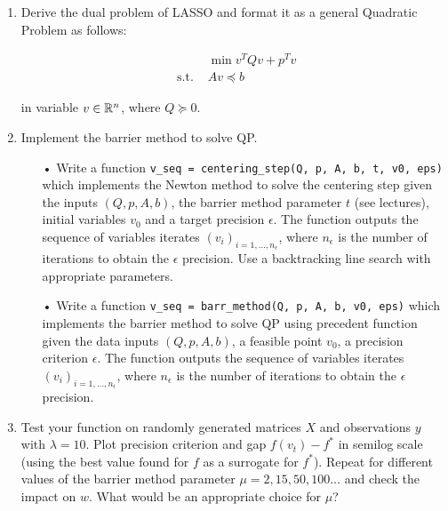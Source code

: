 \documentclass[a4paper, 11pt]{report}
\begin{document}
\begin{enumerate}
	\item Derive the dual problem of LASSO and format it as a general Quadratic Problem as follows:
	
	\begin{equation*}
		\begin{aligned}
		& \min v^{T}Qv + p^{T}v \\
		\text{ s.t. } & Av \preceq b 
		\end{aligned}
	\end{equation*}
	
	in variable $v \in \mathbb{R}^{n}$, where $Q \succeq 0$.
	
	\item Implement the barrier method to solve QP.
	
	\begin{itemize}
		\item[•] Write a function \texttt{v\_seq = centering\_step(Q, p, A, b, t, v0, eps)} which implements the Newton method to solve the centering step given the inputs $(Q, p, A, b)$, the barrier method parameter $t$ (see lectures), initial variables $v_0$ and a target precision $\epsilon$. The function outputs the sequence of variables iterates $\left( v_i \right)_{i = 1, \dots, n_{\epsilon}}$, where $n_{\epsilon}$ is the number of iterations to obtain the $\epsilon$ precision. Use a backtracking line search with appropriate parameters.
		
		\item[•] Write a function \texttt{v\_seq = barr\_method(Q, p, A, b, v0, eps)} which implements the barrier method to solve QP using precedent function given the data inputs $(Q, p, A, b)$, a feasible point $v_0$, a precision criterion $\epsilon$. The function outputs the sequence of variables iterates $\left( v_i \right)_{i =  1, \dots, n_{\epsilon}}$, where $n_{\epsilon}$ is the number of iterations to obtain the $\epsilon$ precision.
	\end{itemize}
	
	\item Test your function on randomly generated matrices $X$ and observations $y$ with $\lambda = 10$. Plot precision criterion and gap $f(v_t) - f^*$ in semilog scale (using the best value found for $f$ as a surrogate for $f^*$). Repeat for different values of the barrier method parameter $\mu = 2, 15, 50, 100 \dots$ and check the impact on $w$. What would be an appropriate choice for $\mu$?
\end{enumerate}
\end{document}
